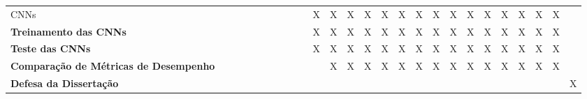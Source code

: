\begin{table}[!ht]
\begin{adjustbox}{width=1\textwidth}
\begin{tabular}{p{5cm}ccccccccccccccccccccccccc}
{  CNNs} &     &      &    &        &           &           &            &        &              &      X       &     X        &     X        &      X       &     X     & X       &      X       &      X        &    X          &     X        &  X    &   X      &     X       &      X      &    X      &    \\
  \textbf{Treinamento das
  CNNs} &     &      &    &        &           &           &            &        &              &      X       &     X        &     X        &      X       &     X     & X       &      X       &      X        &    X          &     X        &  X    &   X      &     X       &      X      &    X      &    \\
  \textbf{Teste das CNNs} &     &      &    &        &           &           &            &        &              &      X       &     X        &     X        &      X       &     X     & X       &      X       &      X        &    X          &     X        &  X    &   X      &     X       &      X      &    X      &    \\
  \textbf{Comparação de Métricas
  de Desempenho}  &     &      &    &        &           &           &            &        &              &             &     X        &     X        &      X       &     X     & X       &      X       &      X        &    X          &     X        &  X    &   X      &     X       &      X      &    X      &    \\
  \textbf{Defesa da Dissertação}  &      &       &      &       &        &     &              &              &             &              &              &           &         &              &             &              &              &          &         &              &      &     &          &  & X \\
  \bottomrule
\end{tabular}
	\end{adjustbox}
\end{table}
